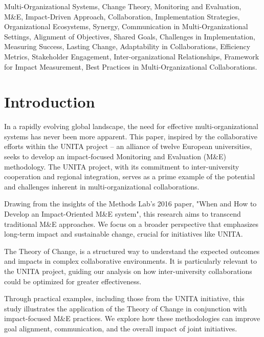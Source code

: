\documentclass[conference]{IEEEtran}
\begin{document}
\vspace{8pt}
\begin{IEEEkeywords}
Multi-Organizational Systems, Change Theory, Monitoring and Evaluation, M\&E, Impact-Driven Approach, Collaboration, Implementation Strategies, Organizational Ecosystems, Synergy, Communication in Multi-Organizational Settings, Alignment of Objectives, Shared Goals, Challenges in Implementation, Measuring Success, Lasting Change, Adaptability in Collaborations, Efficiency Metrics, Stakeholder Engagement, Inter-organizational Relationships, Framework for Impact Measurement, Best Practices in Multi-Organizational Collaborations.
\end{IEEEkeywords}
\vspace{16pt}

\section{Introduction}
\label{intro}
In a rapidly evolving global landscape, the need for effective multi-organizational systems has never been more apparent. This paper, inspired by the collaborative efforts within the UNITA project – an alliance of twelve European universities\cite{unita_unita_nodate}, seeks to develop an impact-focused Monitoring and Evaluation (M\&E) methodology. The UNITA project, with its commitment to inter-university cooperation and regional integration, serves as a prime example of the potential and challenges inherent in multi-organizational collaborations.

Drawing from the insights of the Methods Lab's 2016 paper, "When and How to Develop an Impact-Oriented M\&E system"\cite{hearn_when_2016}, this research aims to transcend traditional M\&E approaches. We focus on a broader perspective that emphasizes long-term impact and sustainable change, crucial for initiatives like UNITA.

The Theory of Change, is a structured way to understand the expected outcomes and impacts in complex collaborative environments. It is particularly relevant to the UNITA project, guiding our analysis on how inter-university collaborations could be optimized for greater effectiveness.

Through practical examples, including those from the UNITA initiative, this study illustrates the application of the Theory of Change in conjunction with impact-focused M\&E practices. We explore how these methodologies can improve goal alignment, communication, and the overall impact of joint initiatives.
\end{document}
